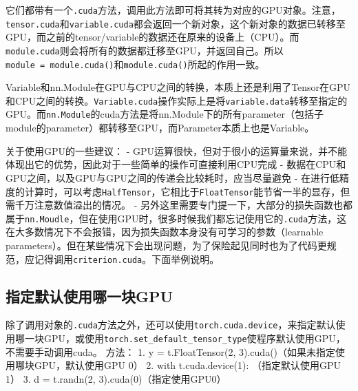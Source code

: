 \documentclass[11pt]{article}
\begin{document}
它们都带有一个\texttt{.cuda}方法，调用此方法即可将其转为对应的GPU对象。注意，\texttt{tensor.cuda}和\texttt{variable.cuda}都会返回一个新对象，这个新对象的数据已转移至GPU，而之前的tensor/variable的数据还在原来的设备上（CPU）。而\texttt{module.cuda}则会将所有的数据都迁移至GPU，并返回自己。所以\texttt{module\ =\ module.cuda()}和\texttt{module.cuda()}所起的作用一致。

Variable和nn.Module在GPU与CPU之间的转换，本质上还是利用了Tensor在GPU和CPU之间的转换。\texttt{Variable.cuda}操作实际上是将\texttt{variable.data}转移至指定的GPU。而\texttt{nn.Module}的cuda方法是将nn.Module下的所有parameter（包括子module的parameter）都转移至GPU，而Parameter本质上也是Variable。

    关于使用GPU的一些建议： -
GPU运算很快，但对于很小的运算量来说，并不能体现出它的优势，因此对于一些简单的操作可直接利用CPU完成
- 数据在CPU和GPU之间，以及GPU与GPU之间的传递会比较耗时，应当尽量避免 -
在进行低精度的计算时，可以考虑\texttt{HalfTensor}，它相比于\texttt{FloatTensor}能节省一半的显存，但需千万注意数值溢出的情况。
-
另外这里需要专门提一下，大部分的损失函数也都属于\texttt{nn.Moudle}，但在使用GPU时，很多时候我们都忘记使用它的\texttt{.cuda}方法，这在大多数情况下不会报错，因为损失函数本身没有可学习的参数（learnable
parameters）。但在某些情况下会出现问题，为了保险起见同时也为了代码更规范，应记得调用\texttt{criterion.cuda}。下面举例说明。

    \subsection{指定默认使用哪一块GPU}\label{ux6307ux5b9aux9ed8ux8ba4ux4f7fux7528ux54eaux4e00ux5757gpu}

除了调用对象的\texttt{.cuda}方法之外，还可以使用\texttt{torch.cuda.device}，来指定默认使用哪一块GPU，或使用\texttt{torch.set\_default\_tensor\_type}使程序默认使用GPU，不需要手动调用cuda。
方法： 1. y = t.FloatTensor(2,
3).cuda()（如果未指定使用哪块GPU，默认使用GPU 0） 2. with
t.cuda.device(1): （指定默认使用GPU 1） 3. d = t.randn(2,
3).cuda(0)（指定使用GPU0）
\end{document}
